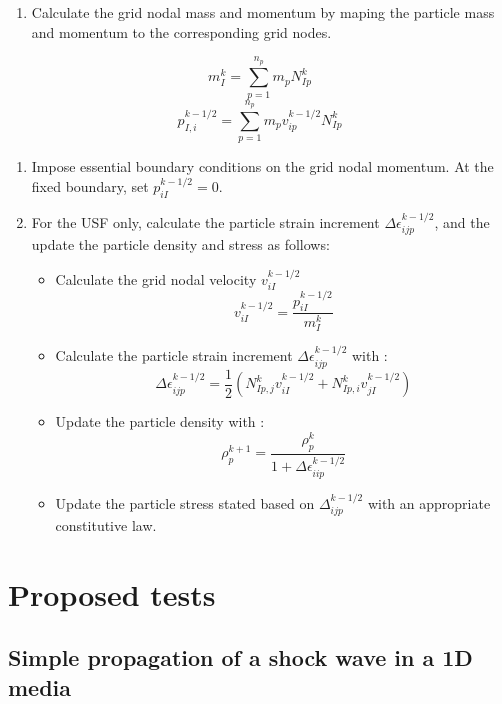 \documentclass[11pt]{article}
\begin{document}
\begin{enumerate}
\item Calculate the grid nodal mass and momentum by maping the particle mass and momentum to the corresponding grid nodes.
\end{enumerate}
\begin{equation}
m_{I}^{k} = \sum^{n_p}_{p=1} m_p N_{Ip}^{k}
\end{equation} 
\begin{equation}
p_{I,i}^{k-1/2} = \sum^{n_p}_{p=1} m_p v_{ip}^{k-1/2}N_{Ip}^{k}
\end{equation}
\begin{enumerate}
\item Impose essential boundary conditions on the grid nodal momentum. At the fixed boundary, set $p_{iI}^{k-1/2} = 0$.
\item For the USF only, calculate the particle strain increment $\Delta \epsilon_{ijp}^{k-1/2}$, and the update the particle density and stress as follows:
\begin{itemize}
\item Calculate the grid nodal velocity $v_{iI}^{k-1/2}$
\begin{equation}
v_{iI}^{k-1/2} = \frac{p_{iI}^{k-1/2}}{m_I^k}
\end{equation}
\item Calculate the particle strain increment $\Delta \epsilon_{ijp}^{k-1/2}$ with :
\begin{equation}
\Delta \epsilon_{ijp}^{k-1/2} = \frac{1}{2}(N_{Ip,j}^{k} v_{iI}^{k-1/2} + N_{Ip,i}^{k} v_{jI}^{k-1/2})
\end{equation}
\item Update the particle density with :
\begin{equation}
\rho_p^{k+1} = \frac{\rho_p^k}{1 + \Delta\epsilon_{iip}^{k-1/2}}
\end{equation}
\item Update the particle stress stated based on $\Delta_{ijp}^{k-1/2}$ with an appropriate constitutive law.
\end{itemize}
\end{enumerate}

\section{Proposed tests}
\label{sec-3}

\subsection{Simple propagation of a shock wave in a 1D media}
\label{sec-3-1}
\end{document}
